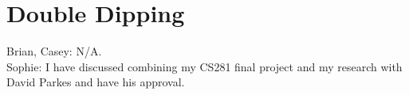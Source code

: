 \documentclass[a4paper, 11pt]{article}
\begin{document}
\section{Double Dipping}
Brian, Casey: N/A. \\
Sophie: I have discussed combining my CS281 final project and my research with David Parkes and have his approval.



\end{document}
